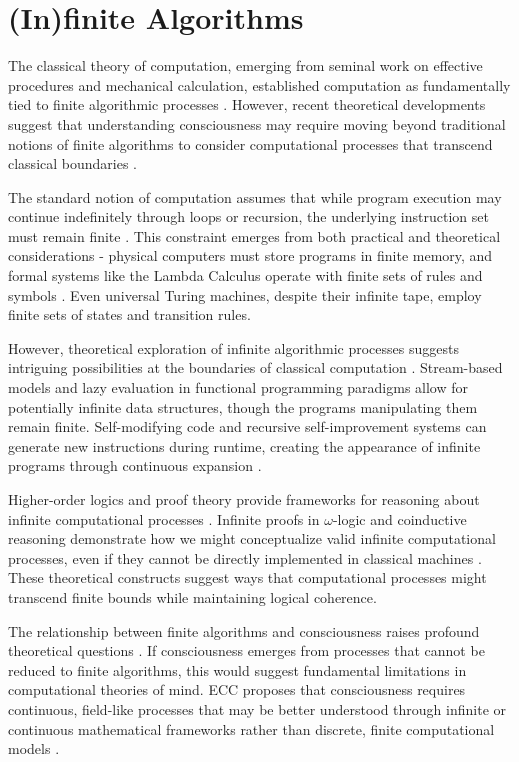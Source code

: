 \section{(In)finite Algorithms}

The classical theory of computation, emerging from seminal work on effective procedures and mechanical calculation, established computation as fundamentally tied to finite algorithmic processes \cite{Davis2000}. However, recent theoretical developments suggest that understanding consciousness may require moving beyond traditional notions of finite algorithms to consider computational processes that transcend classical boundaries \cite{Downey2010}.

The standard notion of computation assumes that while program execution may continue indefinitely through loops or recursion, the underlying instruction set must remain finite \cite{Rogers1987}. This constraint emerges from both practical and theoretical considerations - physical computers must store programs in finite memory, and formal systems like the Lambda Calculus operate with finite sets of rules and symbols \cite{Barendregt1984}. Even universal Turing machines, despite their infinite tape, employ finite sets of states and transition rules.

However, theoretical exploration of infinite algorithmic processes suggests intriguing possibilities at the boundaries of classical computation \cite{Hamkins2014}. Stream-based models and lazy evaluation in functional programming paradigms allow for potentially infinite data structures, though the programs manipulating them remain finite. Self-modifying code and recursive self-improvement systems can generate new instructions during runtime, creating the appearance of infinite programs through continuous expansion \cite{Goldin2006}.

Higher-order logics and proof theory provide frameworks for reasoning about infinite computational processes \cite{Mancosu2008}. Infinite proofs in $\omega$-logic and coinductive reasoning demonstrate how we might conceptualize valid infinite computational processes, even if they cannot be directly implemented in classical machines \cite{Boolos2007}. These theoretical constructs suggest ways that computational processes might transcend finite bounds while maintaining logical coherence.

The relationship between finite algorithms and consciousness raises profound theoretical questions \cite{Hofstadter1999}. If consciousness emerges from processes that cannot be reduced to finite algorithms, this would suggest fundamental limitations in computational theories of mind. ECC proposes that consciousness requires continuous, field-like processes that may be better understood through infinite or continuous mathematical frameworks rather than discrete, finite computational models \cite{Floyd2014}.

